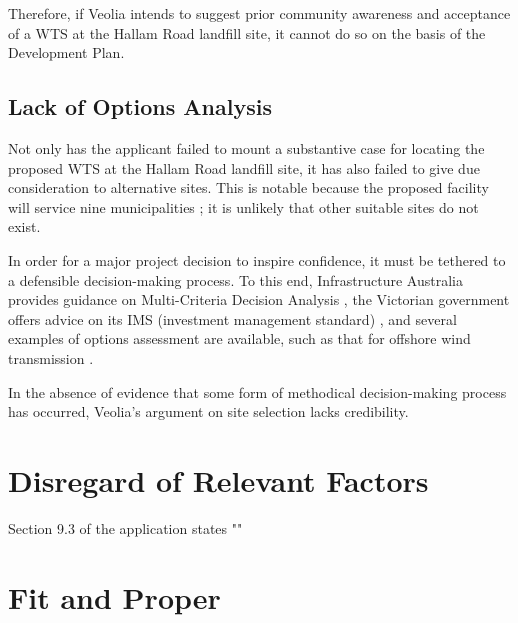 \documentclass{article}
\begin{document}
Therefore, if Veolia intends to suggest prior community awareness and acceptance of a WTS at the Hallam Road landfill site, it cannot do so on the basis of the Development Plan.
 
\subsection{Lack of Options Analysis}

Not only has the applicant failed to mount a substantive case for locating the proposed WTS at the Hallam Road landfill site, it has also failed to give due consideration to alternative sites. This is notable because the proposed facility will service nine municipalities \cite{semawp}; it is unlikely that other suitable sites do not exist.

In order for a major project decision to inspire confidence, it must be tethered to a defensible decision-making process. To this end, Infrastructure Australia provides guidance on Multi-Criteria Decision Analysis \cite{infraus}, the Victorian government offers advice on its IMS (investment management standard) \cite{ims}, and several examples of options assessment are available, such as that for offshore wind transmission \cite{vicgrid}.

In the absence of evidence that some form of methodical decision-making process has occurred, Veolia's argument on site selection lacks credibility.

\section{Disregard of Relevant Factors}

Section 9.3 of the application states "" 

\section{Fit and Proper}



\printbibliography
\end{document}
